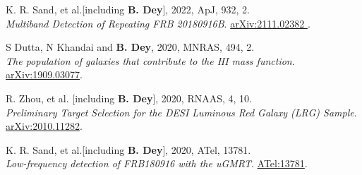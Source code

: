 \begin{etaremune}[leftmargin=40pt,labelsep=10pt]
\item K. R. Sand, et al.[including \textbf{B. Dey}], 2022, ApJ, 932, 2. \\ \textrm{\textit{Multiband Detection of Repeating FRB 20180916B}}. \href{https://arxiv.org/abs/2111.02382}{arXiv:2111.02382 }.

\item S Dutta, N Khandai and \textbf{B. Dey}, 2020, MNRAS, 494, 2. \\ \textrm{\textit{The population of galaxies that contribute to the HI mass function}}. \href{https://arxiv.org/abs/1909.03077}{arXiv:1909.03077}.

\item R. Zhou, et al. [including \textbf{B. Dey}], 2020, RNAAS, 4, 10. \\ \textrm{\textit{Preliminary Target Selection for the DESI Luminous Red Galaxy (LRG) Sample}}. \href{https://arxiv.org/abs/2010.11282}{arXiv:2010.11282}.

\item K. R. Sand, et al.[including \textbf{B. Dey}], 2020, ATel, 13781. \\ \textrm{\textit{Low-frequency detection of FRB180916 with the uGMRT}}. \href{https://www.astronomerstelegram.org/?read=13781}{ATel:13781}.
\end{etaremune} 
